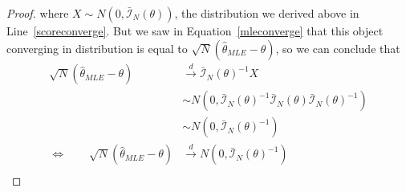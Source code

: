 \documentclass[12pt]{article}
\theoremstyle{plain}
\theoremstyle{definition}
\theoremstyle{remark}
\newcommand{\calI}{\mathcal{I}}
\newcommand{\dto}{\xrightarrow{d}}
\begin{document}
\begin{proof}
where $X \sim N(0,\bar{\calI}_N(\theta))$, the distribution we derived
above in Line~\ref{scoreconverge}. But we saw in
Equation~\ref{mleconverge} that this object converging in distribution
is equal to $\sqrt{N}(\hat{\theta}_{MLE}-\theta)$, so we can conclude
that
\begin{align*}
  \sqrt{N}(\hat{\theta}_{MLE}-\theta)
  &\dto \bar{\calI}_N(\theta)^{-1}X \\
  &\sim N(0,\bar{\calI}_N(\theta)^{-1} \bar{\calI}_N(\theta)
  \bar{\calI}_N(\theta)^{-1})\\
  &\sim N(0, \bar{\calI}_N(\theta)^{-1})\\
  \iff\qquad
  \sqrt{N}(\hat{\theta}_{MLE}-\theta)
  &\dto N(0, \bar{\calI}_N(\theta)^{-1})\\
\end{align*}



\end{proof}


\end{document}
